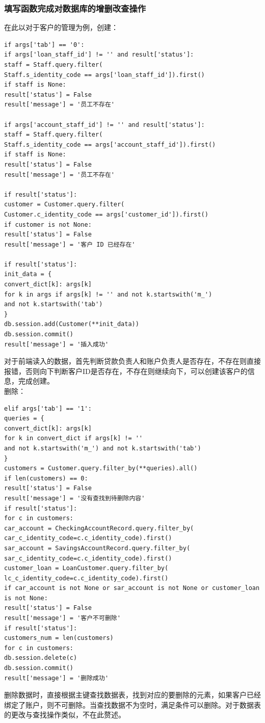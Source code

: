 \documentclass{article}
\begin{document}
	\subsubsection{填写函数完成对数据库的增删改查操作}
	在此以对于客户的管理为例，创建：\\
	\begin{verbatim}
if args['tab'] == '0':
if args['loan_staff_id'] != '' and result['status']:
staff = Staff.query.filter(
Staff.s_identity_code == args['loan_staff_id']).first()
if staff is None:
result['status'] = False
result['message'] = '员工不存在'

if args['account_staff_id'] != '' and result['status']:
staff = Staff.query.filter(
Staff.s_identity_code == args['account_staff_id']).first()
if staff is None:
result['status'] = False
result['message'] = '员工不存在'

if result['status']:
customer = Customer.query.filter(
Customer.c_identity_code == args['customer_id']).first()
if customer is not None:
result['status'] = False
result['message'] = '客户 ID 已经存在'

if result['status']:
init_data = {
convert_dict[k]: args[k]
for k in args if args[k] != '' and not k.startswith('m_')
and not k.startswith('tab')
}
db.session.add(Customer(**init_data))
db.session.commit()
result['message'] = '插入成功'
	\end{verbatim}
	对于前端读入的数据，首先判断贷款负责人和账户负责人是否存在，不存在则直接报错，否则向下判断客户ID是否存在，不存在则继续向下，可以创建该客户的信息，完成创建。\\
	删除：\\
	\begin{verbatim}
elif args['tab'] == '1':
queries = {
convert_dict[k]: args[k]
for k in convert_dict if args[k] != ''
and not k.startswith('m_') and not k.startswith('tab')
}
customers = Customer.query.filter_by(**queries).all()
if len(customers) == 0:
result['status'] = False
result['message'] = '没有查找到待删除内容'
if result['status']:
for c in customers:
car_account = CheckingAccountRecord.query.filter_by(
car_c_identity_code=c.c_identity_code).first()
sar_account = SavingsAccountRecord.query.filter_by(
sar_c_identity_code=c.c_identity_code).first()
customer_loan = LoanCustomer.query.filter_by(
lc_c_identity_code=c.c_identity_code).first()
if car_account is not None or sar_account is not None or customer_loan is not None:
result['status'] = False
result['message'] = '客户不可删除'
if result['status']:
customers_num = len(customers)
for c in customers:
db.session.delete(c)
db.session.commit()
result['message'] = '删除成功'
	\end{verbatim}
	删除数据时，直接根据主键查找数据表，找到对应的要删除的元素，如果客户已经绑定了账户，则不可删除。当查找数据不为空时，满足条件可以删除。对于数据表的更改与查找操作类似，不在此赘述。
\end{document}
